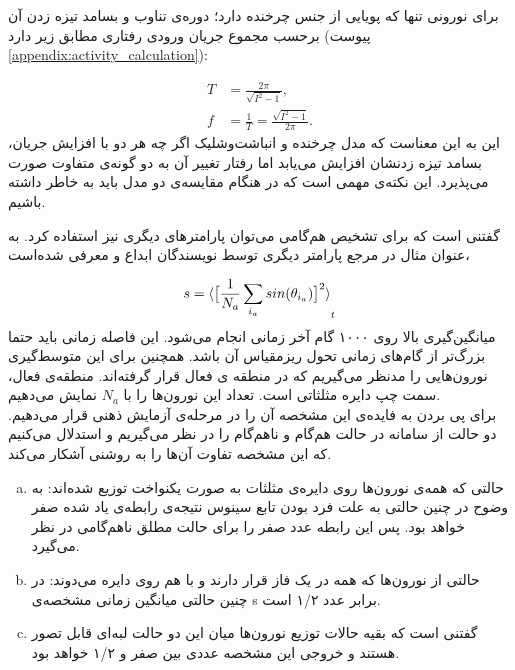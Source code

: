 برای نورونی تنها که پویایی از جنس چرخنده دارد؛ دوره‌ی تناوب و بسامد تیزه زدن آن برحسب مجموع جریان ورودی‌ رفتاری مطابق زیر دارد (پیوست
\ref{appendix:activity_calculation}):

\begin{align}
	T &= \frac{2\pi}{\sqrt{I^2 - 1}},\\
	f &= \frac{1}{T} = \frac{\sqrt{I^2 - 1}}{2\pi}.
\end{align}
این به این معناست که مدل چرخنده و انباشت‌وشلیک اگر چه هر دو با افزایش جریان، بسامد تیزه زدنشان افزایش می‌یابد اما رفتار تغییر آن به دو گونه‌ی متفاوت صورت می‌پذیرد. این نکته‌ی مهمی است که در هنگام مقایسه‌ی دو مدل باید به خاطر داشته باشیم.

گفتنی است که برای تشخیص هم‌گامی می‌توان پارامترهای دیگری نیز استفاده کرد. به عنوان مثال در مرجع
\cite{safaeesirat2020critical}
 پارامتر دیگری توسط نویسندگان ابداع و معرفی شده‌است،

\begin{equation}
	s =  \braket{ \big[ \frac{1}{N_a}\sum_{i_a} sin(\theta_{i_a}) \big]^{2}}_t
	\label{eq:saman_amin_param}
\end{equation}
میانگین‌گیری بالا روی ۱۰۰۰ گام آخر زمانی انجام می‌شود. این فاصله زمانی باید حتما بزرگ‌تر از گام‌های زمانی تحول ریزمقیاس آن باشد. همچنین برای این متوسط‌گیری نورون‌هایی را مدنظر می‌گیریم که در منطقه ی فعال قرار گرفته‌اند. منطقه‌ی فعال، سمت چپ دایره مثلثاتی است. تعداد این نورون‌ها را با $N_a$ نمایش می‌دهیم.\\
برای پی بردن به فایده‌ی این مشخصه آن را در مرحله‌ی آزمایش ذهنی قرار می‌دهیم. دو حالت از سامانه در حالت هم‌گام و نا‌هم‌گام را در نظر می‌گیریم و استدلال می‌کنیم که این مشخصه تفاوت آن‌ها را به روشنی آشکار می‌کند.\\

\begin{enumerate}[(a)]
	\item 
	حالتی که همه‌ی نورون‌ها روی دایره‌ی مثلثات به صورت یکنواخت توزیع شده‌اند: به وضوح در چنین حالتی به علت فرد بودن تابع سینوس نتیجه‌ی رابطه‌ی یاد شده صفر خواهد بود. پس این رابطه عدد صفر را برای حالت مطلق نا‌هم‌گامی در نظر می‌گیرد.
	\item 
	حالتی از نورون‌ها که همه در یک فاز قرار دارند و با هم روی دایره می‌دوند: در چنین حالتی میانگین زمانی مشخصه‌ی s برابر عدد ۱/۲ است.
	\item 
	گفتنی است که بقیه حالات توزیع نورون‌ها میان این دو حالت لبه‌ای قابل تصور هستند و خروجی این مشخصه عددی بین صفر و ۱/۲ خواهد بود.
\end{enumerate}

